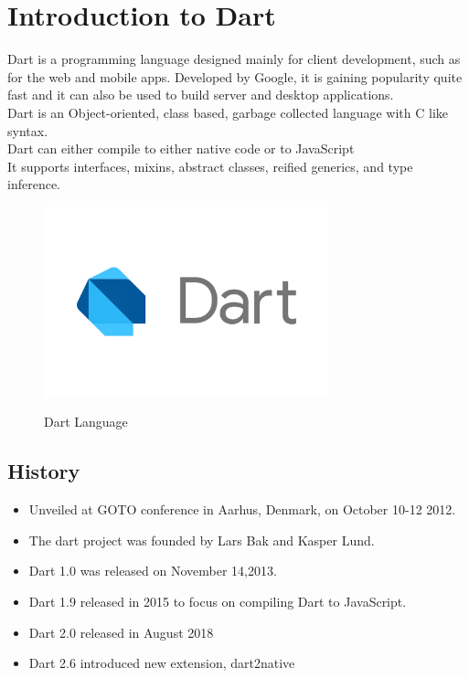 \chapter{Introduction to Dart}
Dart is a programming language designed mainly for client development, such as for the web and mobile apps. Developed by Google, it is gaining popularity quite fast and it can also be used to build server and desktop applications.\\
Dart is an Object-oriented, class based, garbage collected language with C like syntax.\\
Dart can either compile to either native code or to JavaScript\\
It supports interfaces, mixins, abstract classes, reified generics, and type inference.\\

\begin{figure}[h]
  \begin{center}
  \includegraphics[height=55mm]{Images & Logos/CH02_dart.png}\\
  \end{center}
  \caption{Dart Language}
\end{figure}  

\section{History}
\begin{itemize}
  \item Unveiled at GOTO conference in Aarhus, Denmark, on October 10-12 2012.
  \item The dart project was founded by Lars Bak and Kasper Lund.
  \item Dart 1.0 was released on November 14,2013.
  \item Dart 1.9 released in 2015 to focus on compiling Dart to JavaScript.
  \item Dart 2.0 released in August 2018
  \item Dart 2.6 introduced new extension, dart2native
\end{itemize}

